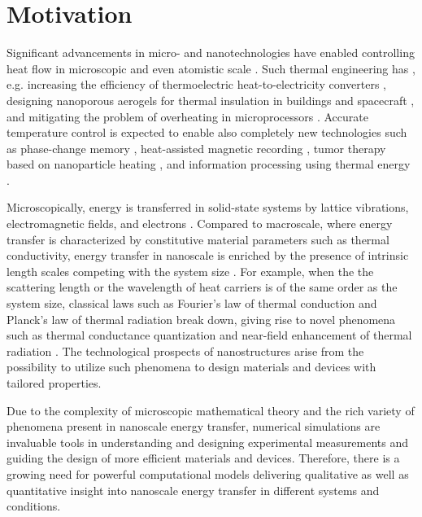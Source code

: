 \label{chap:intro}
\section{Motivation}

Significant advancements in micro- and nanotechnologies have enabled controlling heat flow in microscopic and even atomistic scale \cite{cahill03,cahill14}. Such thermal engineering has , e.g. increasing the efficiency of thermoelectric heat-to-electricity converters \cite{snyder08,vineis10,shakouri11}, designing nanoporous aerogels for thermal insulation in buildings \cite{baetens11} and spacecraft \cite{jones06}, and mitigating the problem of overheating in microprocessors \cite{pop10}. Accurate temperature control is expected to enable also completely new technologies such as phase-change memory \cite{lankhorst05}, heat-assisted magnetic recording \cite{challener09}, tumor therapy based on nanoparticle heating \cite{avedisian09}, and information processing using thermal energy \cite{li12_rmp}. %

Microscopically, energy is transferred in solid-state systems by lattice vibrations, electromagnetic fields, and electrons \cite{chen}. Compared to macroscale, where energy transfer is characterized by constitutive material parameters such as thermal conductivity, energy transfer in nanoscale is enriched by the presence of intrinsic length scales competing with the system size \cite{chen}. For example, when the the scattering length or the wavelength of heat carriers is of the same order as the system size, classical laws such as Fourier's law of thermal conduction \cite{fourier} and Planck's law of thermal radiation \cite{planck00a} break down, giving rise to novel phenomena such as thermal conductance quantization \cite{rego98,angelescu98,schwab00} and near-field enhancement of thermal radiation \cite{volokitin07}. The technological prospects of nanostructures arise from the possibility to utilize such phenomena to design materials and devices with tailored properties. 

Due to the complexity of microscopic mathematical theory and the rich variety of phenomena present in nanoscale energy transfer, numerical simulations are invaluable tools in understanding and designing experimental measurements and guiding the design of more efficient materials and devices. Therefore, there is a growing need for powerful computational models delivering qualitative as well as quantitative insight into nanoscale energy transfer in different systems and conditions. 

